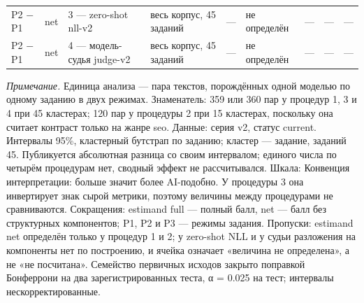 \begin{table}
\begin{tabular}{lllllllll}
P2 − P1 & net & 3 — zero-shot nll-v2 & весь корпус, 45 заданий & — & не определён & — & — & — \\
P2 − P1 & net & 4 — модель-судья judge-v2 & весь корпус, 45 заданий & — & не определён & — & — & — \\
\bottomrule
\end{tabular}
\begin{minipage}{\linewidth}\footnotesize\vspace{2pt}
\textit{Примечание.} Единица анализа — пара текстов, порождённых одной моделью по одному заданию в двух режимах. Знаменатель: 359 или 360 пар у процедур 1, 3 и 4 при 45 кластерах; 120 пар у процедуры 2 при 15 кластерах, поскольку она считает контраст только на жанре seo. Данные: серия v2, статус current. Интервалы 95\%, кластерный бутстрап по заданию; кластер — задание, заданий 45. Публикуется абсолютная разница со своим интервалом; единого числа по четырём процедурам нет, сводный эффект не рассчитывался. Шкала: Конвенция интерпретации: больше значит более AI-подобно. У процедуры 3 она инвертирует знак сырой метрики, поэтому величины между процедурами не сравниваются. Сокращения: estimand full — полный балл, net — балл без структурных компонентов; P1, P2 и P3 — режимы задания. Пропуски: estimand net определён только у процедур 1 и 2; у zero-shot NLL и у судьи разложения на компоненты нет по построению, и ячейка означает «величина не определена», а не «не посчитана». Семейство первичных исходов закрыто поправкой Бонферрони на два зарегистрированных теста, α = 0.025 на тест; интервалы нескорректированные.
\end{minipage}
\end{table}
